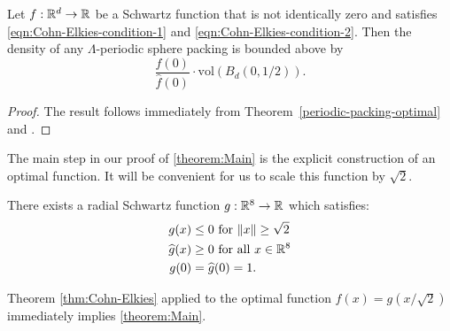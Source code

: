 \begin{theorem}\label{thm:Cohn-Elkies-general}\leanok
  Let $f:\mathbb{R}^d\to\mathbb{R}$ be a Schwartz function that is not identically zero and satisfies \eqref{eqn:Cohn-Elkies-condition-1} and \eqref{eqn:Cohn-Elkies-condition-2}. Then the density of any $\Lambda$-periodic sphere packing is bounded above by $$\frac{f(0)}{\widehat{f}(0)}\cdot \mathrm{vol}(B_d(0,1/2)).$$
\end{theorem}
\begin{proof}\leanok
  The result follows immediately from Theorem~\ref{periodic-packing-optimal} and .
\end{proof}

The main step in our proof of \cref{theorem:Main} is the explicit construction of an optimal function. It will be convenient for us to scale this function by $\sqrt{2}$.
\begin{theorem}\label{thm:g}
There exists a radial Schwartz function $g:\mathbb{R}^8\to\mathbb{R}$ which satisfies:
\begin{align}
g(x)&\leq 0\mbox{ for } \|x\|\geq \sqrt{2} \label{eqn:g1}\\
\widehat{g}(x)&\geq0\mbox{ for all } x\in\mathbb{R}^8\label{eqn:g2}\\
g(0)&=\widehat{g}(0)=1.\label{eqn:g3}
\end{align}
\end{theorem}
Theorem \ref{thm:Cohn-Elkies} applied to the optimal function $f(x)=g(x/\sqrt{2})$ immediately implies \cref{theorem:Main}.
